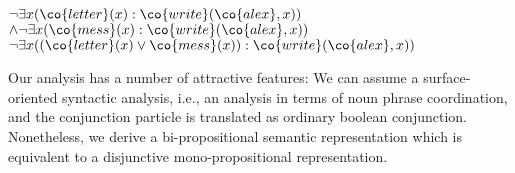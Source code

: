 \documentclass[output=paper]{langsci/langscibook}
\begin{document}
\ea 
\begin{xlist}
\ex \label{alex-cnnp-lf3bi}
$\lnot \exists x (\co{letter}(x) : \co{write}(\co{alex},x))$%
$\land \lnot \exists x (\co{mess}(x) : \co{write}(\co{alex},x))$
\ex \label{alex-cnnp-lf3}
$\lnot \exists x ((\co{letter}(x) \lor \co{mess}(x)) : \co{write}(\co{alex},x))$
\end{xlist}
\z 

Our analysis has a number of attractive features: 
We can assume a surface-oriented syntactic analysis, i.e., an analysis in terms of noun phrase coordination, and the conjunction particle  is translated as ordinary boolean conjunction. 
Nonetheless, we derive a bi-propositional semantic representation which is equivalent to a disjunctive mono-propositional representation.








\end{document}
